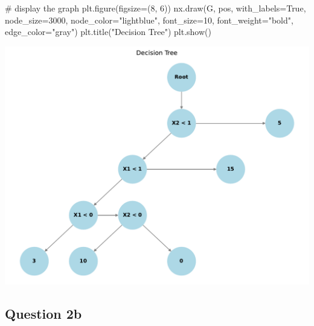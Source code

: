\documentclass[
  letterpaper,
  DIV=11,
  numbers=noendperiod]{scrartcl}
\newenvironment{Shaded}{\begin{snugshade}}{\end{snugshade}}
\newcommand{\CommentTok}[1]{\textcolor[rgb]{0.37,0.37,0.37}{#1}}
\newcommand{\DecValTok}[1]{\textcolor[rgb]{0.68,0.00,0.00}{#1}}
\newcommand{\NormalTok}[1]{\textcolor[rgb]{0.00,0.23,0.31}{#1}}
\newcommand{\OperatorTok}[1]{\textcolor[rgb]{0.37,0.37,0.37}{#1}}
\newcommand{\StringTok}[1]{\textcolor[rgb]{0.13,0.47,0.30}{#1}}
\newcommand{\VariableTok}[1]{\textcolor[rgb]{0.07,0.07,0.07}{#1}}
\begin{document}
\begin{Shaded}
\begin{Highlighting}[]
\CommentTok{\# display the graph}
\NormalTok{plt.figure(figsize}\OperatorTok{=}\NormalTok{(}\DecValTok{8}\NormalTok{, }\DecValTok{6}\NormalTok{))}
\NormalTok{nx.draw(G, pos, with\_labels}\OperatorTok{=}\VariableTok{True}\NormalTok{, node\_size}\OperatorTok{=}\DecValTok{3000}\NormalTok{, node\_color}\OperatorTok{=}\StringTok{"lightblue"}\NormalTok{,}
\NormalTok{        font\_size}\OperatorTok{=}\DecValTok{10}\NormalTok{, font\_weight}\OperatorTok{=}\StringTok{"bold"}\NormalTok{, edge\_color}\OperatorTok{=}\StringTok{"gray"}\NormalTok{)}
\NormalTok{plt.title(}\StringTok{"Decision Tree"}\NormalTok{)}
\NormalTok{plt.show()}
\end{Highlighting}
\end{Shaded}

\includegraphics{PS4_files/figure-pdf/cell-8-output-1.pdf}

\subsection{Question 2b}\label{question-2b}
\end{document}
